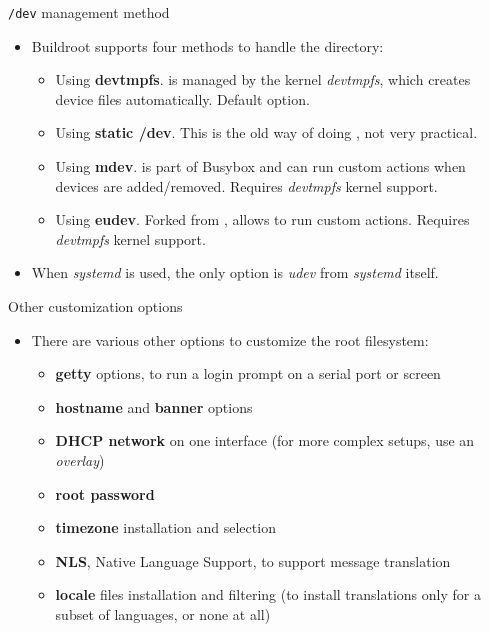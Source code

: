 \begin{frame}{{\tt /dev} management method}
  \begin{itemize}
  \item Buildroot supports four methods to handle the 
    directory:
    \begin{itemize}
    \item Using {\bf devtmpfs}.  is managed by the kernel
      {\em devtmpfs}, which creates device files automatically.
      Default option.
    \item Using {\bf static /dev}. This is the old way of doing
      , not very practical.
    \item Using {\bf mdev}.  is part of Busybox and can run
      custom actions when devices are added/removed. Requires {\em
        devtmpfs} kernel support.
    \item Using {\bf eudev}. Forked from , allows to run
      custom actions. Requires {\em devtmpfs} kernel support.
    \end{itemize}
  \item When {\em systemd} is used, the only option is {\em udev} from
    {\em systemd} itself.
  \end{itemize}
\end{frame}

\begin{frame}{Other customization options}
  \begin{itemize}
  \item There are various other options to customize the root
    filesystem:
    \begin{itemize}
    \item {\bf getty} options, to run a login prompt on a serial port
      or screen
    \item {\bf hostname} and {\bf banner} options
    \item {\bf DHCP network} on one interface (for more complex
      setups, use an {\em overlay})
    \item {\bf root password}
    \item {\bf timezone} installation and selection
    \item {\bf NLS}, Native Language Support, to support message
      translation
    \item {\bf locale} files installation and filtering (to install
      translations only for a subset of languages, or none at all)
    \end{itemize}
  \end{itemize}
\end{frame}

